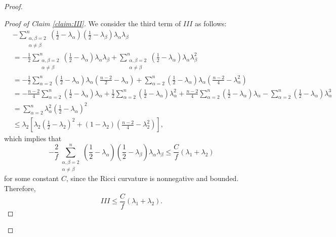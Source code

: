 \documentclass[10pt,a4paper]{amsart}
\begin{document}
\begin{proof}
\begin{proof}[Proof of Claim \ref{claim:III}]
		We consider the third term of $III$ as follows:
		\begin{align*}
			&-\sum_{\substack{\alpha,\beta=2 \\ \alpha\neq\beta}}^n\left(\frac{1}{2} - \lambda_{\alpha}\right)\left(\frac{1}{2} - \lambda_{\beta}\right)\lambda_\alpha\lambda_\beta \\
			&= -\frac{1}{2}\sum_{\substack{\alpha,\beta=2 \\ \alpha\neq\beta}}^n\left(\frac{1}{2} - \lambda_{\alpha}\right)\lambda_\alpha\lambda_\beta
			+ \sum_{\substack{\alpha,\beta=2 \\ \alpha\neq\beta}}^n\left(\frac{1}{2} - \lambda_{\alpha}\right)\lambda_\alpha\lambda_\beta^2 \\
			&= -\frac{1}{2}\sum_{\alpha=2}^n\left(\frac{1}{2} - \lambda_{\alpha}\right)\lambda_\alpha\left(\frac{n-2}{2} - \lambda_\alpha\right)
			+ \sum_{\alpha=2}^n\left(\frac{1}{2} - \lambda_{\alpha}\right)\lambda_\alpha\left(\frac{n-2}{4} - \lambda_\alpha^2\right) \\
			&= -\frac{n-2}{4}\sum_{\alpha=2}^n\left(\frac{1}{2} - \lambda_{\alpha}\right)\lambda_\alpha
			+ \frac{1}{2}\sum_{\alpha=2}^n\left(\frac{1}{2} - \lambda_{\alpha}\right)\lambda_\alpha^2
			+ \frac{n-2}{4}\sum_{\alpha=2}^n\left(\frac{1}{2} - \lambda_{\alpha}\right)\lambda_\alpha
			- \sum_{\alpha=2}^n\left(\frac{1}{2} - \lambda_{\alpha}\right)\lambda_\alpha^3 \\
			&= \sum_{\alpha=2}^n\lambda_\alpha^2\left(\frac{1}{2} - \lambda_{\alpha}\right)^2 \\
			&\leq \lambda_2\left[\lambda_2\left(\frac{1}{2} - \lambda_2\right)^2 + (1-\lambda_2)\left(\frac{n-2}{4} - \lambda_2^2\right)\right],
		\end{align*}
		which implies that
		\[
		-\frac{2}{f}\sum_{\substack{\alpha,\beta=2 \\ \alpha\neq\beta}}^n\left(\frac{1}{2} - \lambda_{\alpha}\right)\left(\frac{1}{2} - \lambda_{\beta}\right)\lambda_\alpha\lambda_\beta
		\leq \frac{C}{f}(\lambda_{1}+\lambda_{2})
		\]
		for some constant $C$, since the Ricci curvature is nonnegative and bounded. Therefore,
		\[
		III \leq \frac{C}{f}(\lambda_{1}+\lambda_{2}).
		\]
	\end{proof}
	
	

\end{proof}
\end{document}
